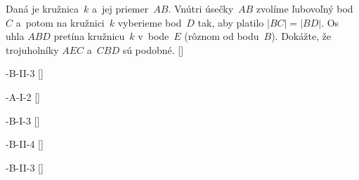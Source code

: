 {Daná je kružnica~$k$ a~jej priemer~$AB$. Vnútri úsečky~$AB$
zvolíme ľubovoľný bod~$C$ a~potom na kružnici~$k$ vyberieme bod~$D$
tak, aby platilo $|BC|=|BD|$. Os uhla $ABD$ pretína
kružnicu~$k$ v~bode~$E$ (rôznom od bodu~$B$).
Dokážte, že trojuholníky $AEC$ a~$CBD$ sú podobné.
[]

-B-II-3 []


-A-I-2
[]

-B-I-3
[]

-B-II-4
[]

-B-II-3
[]

}

